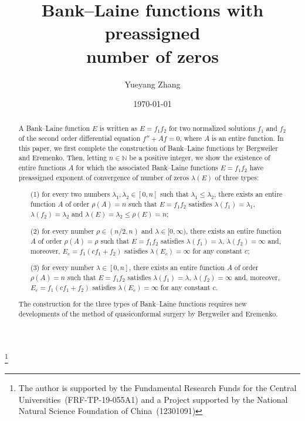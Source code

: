 \documentclass[12pt]{amsart}
\numberwithin{equation}{section}
\begin{document}
\title[Bank--Laine functions]{Bank--Laine functions with preassigned\\
number of zeros}

\author{Yueyang Zhang}
\address{School of Mathematics and Physics, University of Science and Technology Beijing, No.~30 Xueyuan Road, Haidian, Beijing, 100083, P.R. China}
\thanks{The author is supported by the Fundamental Research Funds for the Central Universities~{(FRF-TP-19-055A1)} and a Project supported by the National Natural Science Foundation of China~{(12301091)}}





\date{\today}

\commby{}

\begin{abstract}
A Bank--Laine function $E$ is written as $E=f_1f_2$ for two normalized solutions $f_1$ and $f_2$ of the second order differential equation $f''+Af=0$, where $A$ is an entire function. In this paper, we first complete the construction of Bank--Laine functions by Bergweiler and Eremenko. Then, letting $n\in \mathbb{N}$ be a positive integer, we show the existence of entire functions $A$ for which the associated Bank--Laine functions $E=f_1f_2$ have preassigned exponent of convergence of number of zeros $\lambda(E)$ of three types:

\begin{enumerate}
\item [(1)]
for every two numbers $\lambda_1,\lambda_2\in[0,n]$ such that $\lambda_1\leq \lambda_2$, there exists an entire function $A$ of order $\rho(A)=n$ such that $E=f_1f_2$ satisfies $\lambda(f_1)=\lambda_1$, $\lambda(f_2)=\lambda_2$ and $\lambda(E)=\lambda_2\leq \rho(E)=n$;

\item [(2)]
for every number $\rho\in(n/2,n)$ and $\lambda\in[0,\infty)$, there exists an entire function $A$ of order $\rho(A)=\rho$ such that $E=f_1f_2$ satisfies $\lambda(f_1)=\lambda$, $\lambda(f_2)=\infty$ and, moreover, $E_c=f_1(cf_1+f_2)$ satisfies $\lambda(E_c)=\infty$ for any constant $c$;

\item [(3)]
for every number $\lambda\in[0,n]$, there exists an entire function $A$ of order $\rho(A)=n$ such that $E=f_1f_2$ satisfies $\lambda(f_1)=\lambda$, $\lambda(f_2)=\infty$ and, moreover, $E_c=f_1(cf_1+f_2)$ satisfies $\lambda(E_c)=\infty$ for any constant $c$.
\end{enumerate}
The construction for the three types of Bank--Laine functions requires new developments of the method of quasiconformal surgery by Bergweiler and Eremenko.

\end{abstract}
\end{document}

